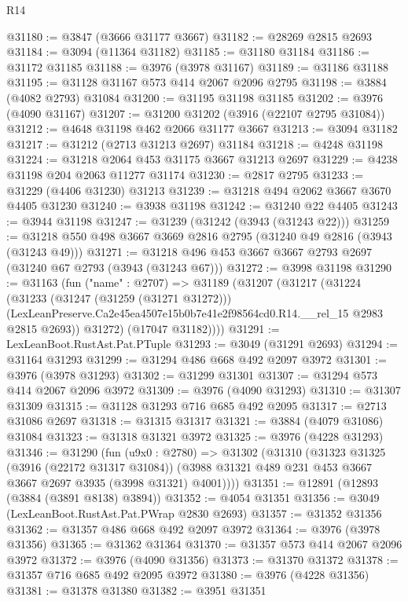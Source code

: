 \begin{lexlean}{R14}
\begin{coremodule}
@31180 := @3847 (@3666 @31177 @3667)
@31182 := @28269 @2815 @2693
@31184 := @3094 (@11364 @31182)
@31185 := @31180 @31184
@31186 := @31172 @31185
@31188 := @3976 (@3978 @31167)
@31189 := @31186 @31188
@31195 := @31128 @31167 @573 @414 @2067 @2096 @2795
@31198 := @3884 (@4082 @2793) @31084
@31200 := @31195 @31198 @31185
@31202 := @3976 (@4090 @31167)
@31207 := @31200 @31202 (@3916 (@22107 @2795 @31084))
@31212 := @4648 @31198 @462 @2066 @31177 @3667
@31213 := @3094 @31182
@31217 := @31212 (@2713 @31213 @2697) @31184
@31218 := @4248 @31198
@31224 := @31218 @2064 @453 @31175 @3667 @31213 @2697
@31229 := @4238 @31198 @204 @2063 @11277 @31174
@31230 := @2817 @2795
@31233 := @31229 (@4406 @31230) @31213
@31239 := @31218 @494 @2062 @3667 @3670 @4405 @31230
@31240 := @3938 @31198
@31242 := @31240 @22 @4405
@31243 := @3944 @31198
@31247 := @31239 (@31242 (@3943 (@31243 @22)))
@31259 := @31218 @550 @498 @3667 @3669 @2816 @2795 (@31240 @49 @2816 (@3943 (@31243 @49)))
@31271 := @31218 @496 @453 @3667 @3667 @2793 @2697 (@31240 @67 @2793 (@3943 (@31243 @67)))
@31272 := @3998 @31198
@31290 := @31163
    (fun ("name" : @2707) =>
    @31189
      (@31207
        (@31217
          (@31224
            (@31233
              (@31247 (@31259 (@31271 @31272)))
              (LexLeanPreserve.Ca2e45ea4507e15b0b7e41e2f98564cd0.R14.__rel_15 @2983 @2815 @2693))
            @31272)
          (@17047 @31182))))
@31291 := LexLeanBoot.RustAst.Pat.PTuple
@31293 := @3049 (@31291 @2693)
@31294 := @31164 @31293
@31299 := @31294 @486 @668 @492 @2097 @3972
@31301 := @3976 (@3978 @31293)
@31302 := @31299 @31301
@31307 := @31294 @573 @414 @2067 @2096 @3972
@31309 := @3976 (@4090 @31293)
@31310 := @31307 @31309
@31315 := @31128 @31293 @716 @685 @492 @2095
@31317 := @2713 @31086 @2697
@31318 := @31315 @31317
@31321 := @3884 (@4079 @31086) @31084
@31323 := @31318 @31321 @3972
@31325 := @3976 (@4228 @31293)
@31346 := @31290
    (fun (u9x0 : @2780) =>
    @31302
      (@31310
        (@31323
          @31325
          (@3916 (@22172 @31317 @31084))
          (@3988 @31321 @489 @231 @453 @3667 @3667 @2697 @3935 (@3998 @31321) @4001))))
@31351 := @12891 (@12893 (@3884 (@3891 @8138) @3894))
@31352 := @4054 @31351
@31356 := @3049 (LexLeanBoot.RustAst.Pat.PWrap @2830 @2693)
@31357 := @31352 @31356
@31362 := @31357 @486 @668 @492 @2097 @3972
@31364 := @3976 (@3978 @31356)
@31365 := @31362 @31364
@31370 := @31357 @573 @414 @2067 @2096 @3972
@31372 := @3976 (@4090 @31356)
@31373 := @31370 @31372
@31378 := @31357 @716 @685 @492 @2095 @3972
@31380 := @3976 (@4228 @31356)
@31381 := @31378 @31380
@31382 := @3951 @31351

\end{coremodule}
\end{lexlean}
